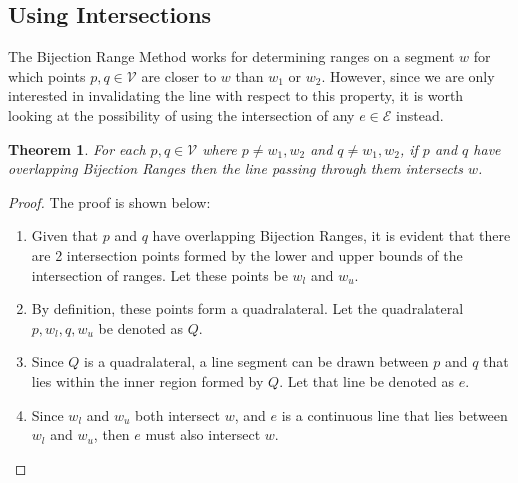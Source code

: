 \documentclass[12pt]{article}
\newtheorem{theorem}{Theorem}[section]
\begin{document}
\subsection*{Using Intersections}\label{subsec*:intersection-method}
The Bijection Range Method works for determining ranges on a segment $w$
for which points $p,q \in \mathcal{V}$ are closer to $w$ than $w_1$ or $w_2$.
However, since we are only interested
in invalidating the line with respect to this property, it is worth looking at
the possibility of using the intersection of any $e \in \mathcal{E}$ instead.
\begin{theorem}\label{thm:overlap}
For each $p,q \in \mathcal{V}$ where $p \neq w_1,w_2$ and $q \neq w_1,w_2$,
if $p$ and $q$ have overlapping Bijection Ranges
then the line passing through them intersects $w$.
\end{theorem}
\begin{proof}
The proof is shown below:
\begin{enumerate}[(1)]
\item Given that $p$ and $q$ have overlapping Bijection Ranges,
it is evident that there are 2 intersection points formed by
the lower and upper bounds of the intersection of ranges.
Let these points be $w_l$ and $w_u$.
\item By definition, these points form a quadralateral.
Let the quadralateral $p,w_l,q,w_u$ be denoted as $Q$.
\item Since $Q$ is a quadralateral,
a line segment can be drawn between $p$ and $q$ that lies within
the inner region formed by $Q$.
Let that line be denoted as $e$.
\item Since $w_l$ and $w_u$ both intersect $w$, and $e$ is a continuous line
that lies between $w_l$ and $w_u$, then $e$ must also intersect $w$.
\end{enumerate}
\end{proof}
\end{document}
